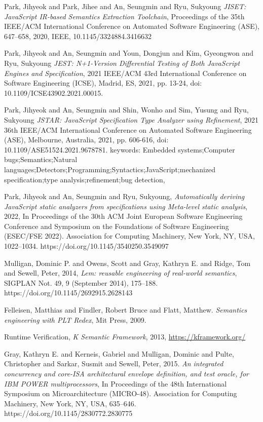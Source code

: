 \begin{thebibliography}{00}
 Park, Jihyeok and Park, Jihee and An, Seungmin and Ryu, Sukyoung \textit{JISET: JavaScript IR-based Semantics Extraction Toolchain}, Proceedings of the 35th IEEE/ACM International Conference on Automated Software Engineering (ASE), 647--658, 2020, IEEE, 10.1145/3324884.3416632

 Park, Jihyeok and An, Seungmin and Youn, Dongjun and Kim, Gyeongwon and Ryu, Sukyoung \textit{JEST: N+1-Version Differential Testing of Both JavaScript Engines and Specification}, 2021 IEEE/ACM 43rd International Conference on Software Engineering (ICSE), Madrid, ES, 2021, pp. 13-24, doi: 10.1109/ICSE43902.2021.00015.

 Park, Jihyeok and An, Seungmin and Shin, Wonho and Sim, Yusung and Ryu, Sukyoung \textit{JSTAR: JavaScript Specification Type Analyzer using Refinement}, 2021 36th IEEE/ACM International Conference on Automated Software Engineering (ASE), Melbourne, Australia, 2021, pp. 606-616, doi: 10.1109/ASE51524.2021.9678781. keywords: {Embedded systems;Computer bugs;Semantics;Natural languages;Detectors;Programming;Syntactics;JavaScript;mechanized specification;type analysis;refinement;bug detection},

 Park, Jihyeok and An, Seungmin and Ryu, Sukyoung, \textit{Automatically deriving JavaScript static analyzers from specifications using Meta-level static analysis}, 2022, In Proceedings of the 30th ACM Joint European Software Engineering Conference and Symposium on the Foundations of Software Engineering (ESEC/FSE 2022). Association for Computing Machinery, New York, NY, USA, 1022–1034. https://doi.org/10.1145/3540250.3549097

 Mulligan, Dominic P. and Owens, Scott and Gray, Kathryn E. and Ridge, Tom and Sewell, Peter, 2014, \textit{Lem: reusable engineering of real-world semantics}, SIGPLAN Not. 49, 9 (September 2014), 175–188. https://doi.org/10.1145/2692915.2628143

 Felleisen, Matthias and Findler, Robert Bruce and Flatt, Matthew. \textit{Semantics engineering with PLT Redex}, Mit Press, 2009.

 Runtime Verification, \textit{K Semantic Framework}, 2013, \url{https://kframework.org/}

 Gray, Kathryn E. and Kerneis, Gabriel and Mulligan, Dominic and Pulte, Christopher and Sarkar, Susmit and Sewell, Peter, 2015. \textit{An integrated concurrency and core-ISA architectural envelope definition, and test oracle, for IBM POWER multiprocessors}, In Proceedings of the 48th International Symposium on Microarchitecture (MICRO-48). Association for Computing Machinery, New York, NY, USA, 635–646. https://doi.org/10.1145/2830772.2830775


\end{thebibliography}

